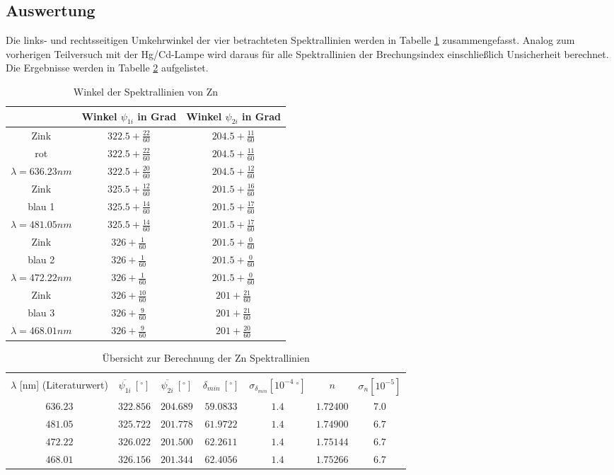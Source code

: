\documentclass[12pt,a4paper]{article}
\begin{document}
\subsection{Auswertung}
Die links- und rechtsseitigen Umkehrwinkel der vier betrachteten Spektrallinien werden in Tabelle \ref{table:Winkel_Rohdaten_Zn} zusammengefasst. Analog zum vorherigen Teilversuch mit der Hg/Cd-Lampe wird daraus für alle Spektrallinien der Brechungsindex einschließlich Unsicherheit berechnet. Die Ergebnisse werden in Tabelle \ref{table:Zn_Rechnung} aufgelistet.\\
\begin{table}[H]
	\centering
	\begin{tabular}{|c|c|c|}
		\hline
		& Winkel $\psi_{1i}$ in Grad & Winkel $\psi_{2i}$ in Grad\\
		\hline
		Zink&$322.5+\frac{22}{60}$&$204.5+\frac{11}{60}$\\[0.1cm]
		rot&$322.5+\frac{22}{60}$&$204.5+\frac{11}{60}$\\[0.1cm]
		$\lambda=636.23nm$&$322.5+\frac{20}{60}$&$204.5+\frac{12}{60}$\\[0.1cm]
		\hline
		Zink&$325.5+\frac{12}{60}$&$201.5+\frac{16}{60}$\\[0.1cm]
		blau 1&$325.5+\frac{14}{60}$&$201.5+\frac{17}{60}$\\[0.1cm]
		$\lambda=481.05nm$&$325.5+\frac{14}{60}$&$201.5+\frac{17}{60}$\\[0.1cm]
		\hline
		Zink&$326+\frac{1}{60}$&$201.5+\frac{0}{60}$\\[0.1cm]
		blau 2&$326+\frac{1}{60}$&$201.5+\frac{0}{60}$\\[0.1cm]
		$\lambda=472.22nm$&$326+\frac{1}{60}$&$201.5+\frac{0}{60}$\\[0.1cm]
		\hline
		Zink&$326+\frac{10}{60}$&$201+\frac{21}{60}$\\[0.1cm]
		blau 3&$326+\frac{9}{60}$&$201+\frac{21}{60}$\\[0.1cm]
		$\lambda=468.01nm$&$326+\frac{9}{60}$&$201+\frac{20}{60}$\\[0.1cm]
		\hline
	\end{tabular}
	\caption{Winkel der Spektrallinien von Zn}
	\label{table:Winkel_Rohdaten_Zn}
\end{table}
\begin{table}[H]
	\centering
	\begin{tabular}{|c|c|c|c|c|c|c|}
		\hline
		&&&&&&\\
		$\lambda$ [nm] (Literaturwert)&$\overline{\psi_{1i}}\ [^{\circ}]$&$\overline{\psi_{2i}}\ [^{\circ}]$&$\delta_{min}\ [^{\circ}]$&$\sigma_{\delta_{min}}[10^{-4}\ ^{\circ}]$& $n$ & $\sigma_{n}[10^{-5}]$\\
		\hline
		$636.23$&$322.856$&$204.689$&$59.0833$&$1.4$&$1.72400$&$7.0$\\
		$481.05$&$325.722$&$201.778$&$61.9722$&$1.4$&$1.74900$&$6.7$\\
		$472.22$&$326.022$&$201.500$&$62.2611$&$1.4$&$1.75144$&$6.7$\\
		$468.01$&$326.156$&$201.344$&$62.4056$&$1.4$&$1.75266$&$6.7$\\
		\hline
	\end{tabular}
	\caption{Übersicht zur Berechnung der Zn Spektrallinien}
	\label{table:Zn_Rechnung}
\end{table}
\end{document}
